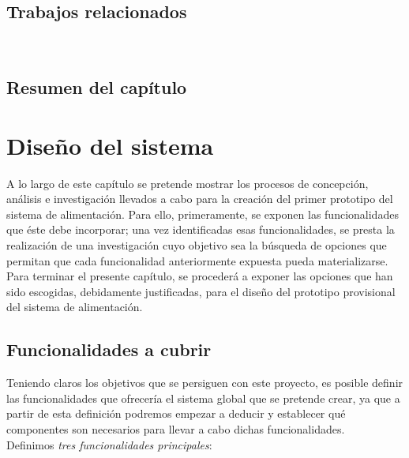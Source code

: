 \documentclass[12pt]{article}
\begin{document}
	\subsection[Trabajos relacionados]{Trabajos relacionados}
	
	\\

	
	\subsection[Resumen del capítulo]{Resumen del capítulo}
	
	\pagebreak
	
	\section[Diseño del sistema]{Diseño del sistema}
	\label{Sección 3: Diseño del sistema}
	\noindent A lo largo de este capítulo se pretende mostrar los procesos de concepción, análisis e investigación llevados a cabo para la creación del primer prototipo del sistema de alimentación. Para ello, primeramente, se exponen las funcionalidades que éste debe incorporar; una vez identificadas esas funcionalidades, se presta la realización de una investigación cuyo objetivo sea la búsqueda de opciones que permitan que cada funcionalidad anteriormente expuesta pueda materializarse. Para terminar el presente capítulo, se procederá a exponer las opciones que han sido escogidas, debidamente justificadas, para el diseño del prototipo provisional del sistema de alimentación. 
	
	\subsection[Funcionalidades a cubrir]{Funcionalidades a cubrir}
	
	\noindent Teniendo claros los objetivos que se persiguen con este proyecto, es posible definir las funcionalidades que ofrecería el sistema global que se pretende crear, ya que a partir de esta definición podremos empezar a deducir y establecer qué componentes son necesarios para llevar a cabo dichas funcionalidades. \\
	
	\noindent Definimos \textit{tres funcionalidades principales}: 
	
\end{document}
